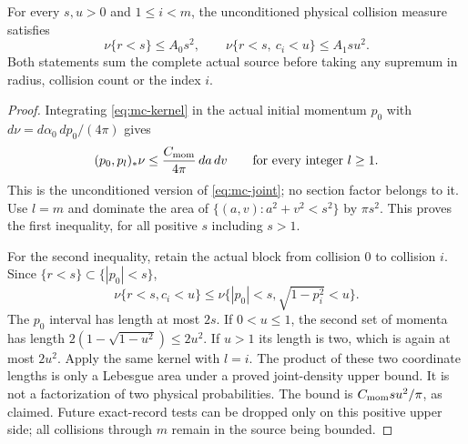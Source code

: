 \begin{lemma}
\label{lem:sm-intersection}
For every $s,u>0$ and $1\le i<m$, the unconditioned physical
collision measure satisfies
\begin{equation}\label{eq:sm-intersection}
 \nu\{r<s\}\le A_0s^2,\qquad
 \nu\{r<s,\ c_i<u\}\le A_1s u^2.
\end{equation}
Both statements sum the complete actual source before taking any
supremum in radius, collision count or the index $i$.
\end{lemma}
\begin{proof}
Integrating \eqref{eq:mc-kernel} in the actual initial momentum
$p_0$ with $d\nu=d\alpha_0\,dp_0/(4\pi)$ gives
\[
 (p_0,p_l)_*\nu\le\frac{C_{\rm mom}}{4\pi}\,da\,dv
 \qquad\hbox{for every integer }l\ge1.
\]
This is the unconditioned version of \eqref{eq:mc-joint}; no
section factor belongs to it.  Use $l=m$ and dominate the area
of $\{(a,v):a^2+v^2<s^2\}$ by $\pi s^2$.  This proves the
first inequality, for all positive $s$ including $s>1$.

For the second inequality, retain the actual block from collision
$0$ to collision $i$.  Since $\{r<s\}\subset\{|p_0|<s\}$,
\[
 \nu\{r<s,c_i<u\}
 \le\nu\{|p_0|<s,\sqrt{1-p_i^2}<u\}.
\]
The $p_0$ interval has length at most $2s$.  If $0<u\le1$,
the second set of momenta has length
$2(1-\sqrt{1-u^2})\le2u^2$.  If $u>1$ its length is two,
which is again at most $2u^2$.  Apply the same kernel with $l=i$.
The product of these two coordinate lengths is only a Lebesgue
area under a proved joint-density upper bound.  It is not a
factorization of two physical probabilities.  The bound is
$C_{\rm mom}s u^2/\pi$, as claimed.  Future exact-record
tests can be dropped only on this positive upper side; all
collisions through $m$ remain in the source being bounded.
\end{proof}

